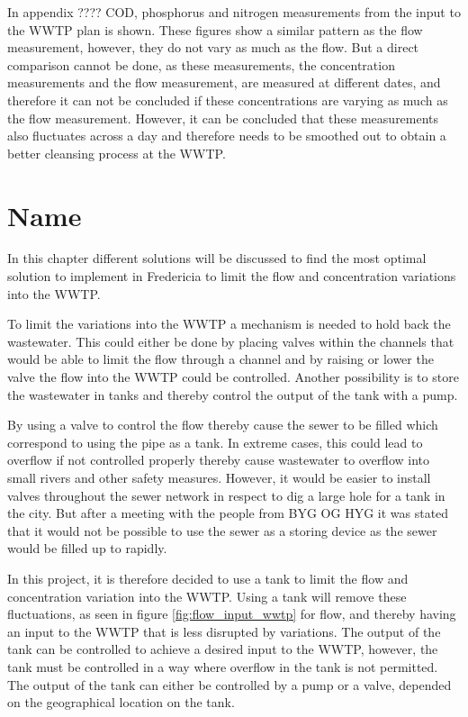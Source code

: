 In appendix ???? COD, phosphorus and nitrogen measurements from the input to the WWTP plan is shown. These figures show a similar pattern as the flow measurement, however, they do not vary as much as the flow. But a direct comparison cannot be done, as these measurements, the concentration measurements and the flow measurement, are measured at different dates, and therefore it can not be concluded if these concentrations are varying as much as the flow measurement. However, it can be concluded that these measurements also fluctuates across a day and therefore needs to be smoothed out to obtain a better cleansing process at the WWTP. 



\chapter{Name}\label{ch:}
In this chapter different solutions will be discussed to find the most optimal solution to implement in Fredericia to limit the flow and concentration variations into the WWTP.

To limit the variations into the WWTP a mechanism is needed to hold back the wastewater. This could either be done by placing valves within the channels that would be able to limit the flow through a channel and by raising or lower the valve the flow into the WWTP could be controlled. Another possibility is to store the wastewater in tanks and thereby control the output of the tank with a pump. 

By using a valve to control the flow thereby cause the sewer to be filled which correspond to using the pipe as a tank. In extreme cases, this could lead to overflow if not controlled properly thereby cause wastewater to overflow into small rivers and other safety measures. However, it would be easier to install valves throughout the sewer network in respect to dig a large hole for a tank in the city. But after a meeting with the people from BYG OG HYG  it was stated that it would not be possible to use the sewer as a storing device as the sewer would be filled up to rapidly.     

In this project, it is therefore decided to use a tank to limit the flow and concentration variation into the WWTP. Using a tank will remove these fluctuations, as seen in figure \ref{fig:flow_input_wwtp} for flow, and thereby having an input to the WWTP that is less disrupted by variations. The output of the tank can be controlled to achieve a desired input to the WWTP, however, the tank must be controlled in a way where overflow in the tank is not permitted. The output of the tank can either be controlled by a pump or a valve, depended on the geographical location on the tank.    